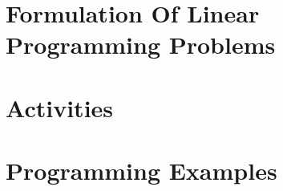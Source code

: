 \documentclass[../main.tex]{subfiles}
\begin{document}
\section{Formulation Of Linear Programming Problems}
\label{sec:model-examples}



 













\section{Activities}
\label{sec:activities}








\section{Programming Examples}
\label{sec:programming}

\begin{framecode}{}{}
  
\end{framecode}
\begin{framecode}{}{}
  
\end{framecode}
\begin{framecode}{}{}
  
\end{framecode}
\begin{frame}
  \maketitle
\end{frame}
\end{document}
